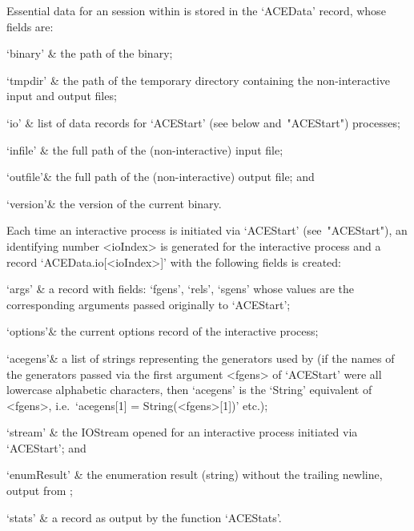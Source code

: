 
Essential data for an {\ACE} session within {\GAP} is  stored  in  the
`ACEData'{\undoquotes{}}   record,
whose fields are:

\beginitems

\quad`binary' & the path of the {\ACE} binary;

\quad`tmpdir' & the path of the  temporary  directory  containing  the
non-interactive {\ACE} input and output files;

\quad`io'     & list  of  data  records  for  `ACEStart'   (see  below 
and~"ACEStart") processes;

\quad`infile' & the full path of the  (non-interactive)  {\ACE}  input
file;

\quad`outfile'& the full path of the (non-interactive)  {\ACE}  output
file; and

\quad`version'& the version of the current {\ACE} binary.

\enditems

Each time an interactive {\ACE} process is  initiated  via  `ACEStart'
(see~"ACEStart"), an identifying number <ioIndex> is generated for the
interactive process and  a  record  `ACEData.io[<ioIndex>]'  with  the
following fields is created:

\beginitems

\quad`args'   & a record with fields: `fgens', `rels',  `sgens'  whose
values  are  the  corresponding   arguments   passed   originally   to
`ACEStart';

\quad`options'& the current options record of the interactive process;

\quad`acegens'& a list of strings representing the generators used  by
{\ACE} (if the names of the generators passed via the  first  argument
<fgens> of `ACEStart' were all lowercase alphabetic  characters,  then
`acegens' is the `String' equivalent of <fgens>,  i.e.~`acegens[1]   =
String(<fgens>[1])' etc.);

\quad`stream' & the IOStream opened for an interactive {\ACE}  process
initiated via `ACEStart'; and

\quad`enumResult' 
              & the enumeration result (string) without  the  trailing
newline, output from {\ACE};

\quad`stats'  & a record as output by the function `ACEStats'.

\enditems

